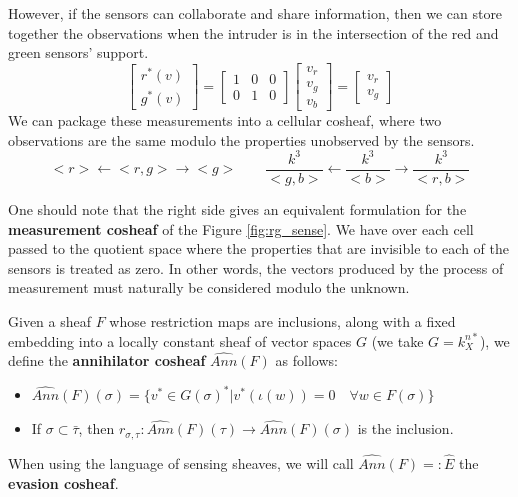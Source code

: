 However, if the sensors can collaborate and share information, then we can store together the observations when the intruder is in the intersection of the red and green sensors' support.
\[
	\begin{bmatrix} r^*(v) \\ g^*(v)\end{bmatrix}=\begin{bmatrix} 1 & 0 & 0 \\ 0 & 1 & 0\end{bmatrix}\begin{bmatrix} v_r \\ v_g \\ v_b\end{bmatrix}=\begin{bmatrix} v_r \\ v_g\end{bmatrix}
\]
We can package these measurements into a cellular cosheaf, where two observations are the same modulo the properties unobserved by the sensors.
\[
	<r> \leftarrow <r,g> \rightarrow <g> \qquad \frac{k^3}{<g,b>} \leftarrow \frac{k^3}{<b>} \rightarrow \frac{k^3}{<r,b>}
\]

One should note that the right side gives an equivalent formulation for the \textbf{measurement cosheaf} of the Figure \ref{fig:rg_sense}. We have over each cell passed to the quotient space where the properties that are invisible to each of the sensors is treated as zero. In other words, the vectors produced by the process of measurement must naturally be considered modulo the unknown.

\begin{defn}
	Given a sheaf $F$ whose restriction maps are inclusions, along with a fixed embedding into a locally constant sheaf of vector spaces $G$ (we take $G=k^{n*}_X$), we define the \textbf{annihilator cosheaf} $\widehat{Ann}(F)$ as follows:
	\begin{itemize}
		\item $\widehat{Ann}(F)(\sigma)=\{v^*\in G(\sigma)^{*}| v^*(\iota(w))=0\quad \forall w\in F(\sigma)\}$
		\item If $\sigma\subset\bar{\tau}$, then $r_{\sigma,\tau}:\widehat{Ann}(F)(\tau)\to \widehat{Ann}(F)(\sigma)$ is the inclusion.
	\end{itemize}
	When using the language of sensing sheaves, we will call $\widehat{Ann}(F)=:\hat{E}$ the \textbf{evasion cosheaf}.
\end{defn}

